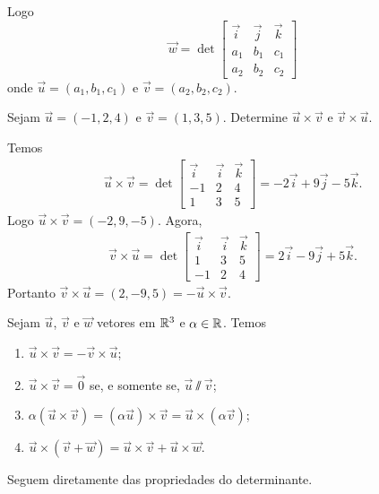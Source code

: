 Logo
\[
    \vec{w} = \det \begin{bmatrix}
        \vec{i} & \vec{j} & \vec{k} \\
        a_1     & b_1     & c_1     \\
        a_2     & b_2     & c_2
    \end{bmatrix}
\]
onde $\vec{u} = (a_1,b_1,c_1)$ e $\vec{v} = (a_2,b_2,c_2)$.

\begin{exemplo}
    Sejam $\vec{u} = (-1,2,4)$ e $\vec{v} = (1,3,5)$. Determine $\vec{u}\times\vec{v}$ e $\vec{v}\times\vec{u}$.
    \begin{solucao}
        Temos
        \begin{align*}
            \vec{u}\times\vec{v} = \det \begin{bmatrix}
                                            \vec{i} & \vec{i} & \vec{k} \\
                                            -1      & 2       & 4       \\
                                            1       & 3       & 5
                                        \end{bmatrix} = -2\vec{i} + 9\vec{j} - 5\vec{k}.
        \end{align*}
        Logo $\vec{u}\times\vec{v} = (-2,9,-5)$.
        Agora,
        \begin{align*}
            \vec{v}\times\vec{u} = \det \begin{bmatrix}
                                            \vec{i} & \vec{i} & \vec{k} \\
                                            1       & 3       & 5       \\
                                            -1      & 2       & 4
                                        \end{bmatrix} = 2\vec{i} - 9\vec{j} + 5\vec{k}.
        \end{align*}
        Portanto $\vec{v}\times\vec{u} = (2,-9,5) = -\vec{u}\times\vec{v}$.
    \end{solucao}
\end{exemplo}

\begin{proposicao}
    Sejam $\vec{u}$, $\vec{v}$ e $\vec{w}$ vetores em $\mathbb{R}^3$ e $\alpha \in \mathbb{R}$. Temos
    \begin{enumerate}[label=({\alph*})]
        \item $\vec{u}\times\vec{v} = -\vec{v}\times\vec{u}$;
        \item $\vec{u}\times\vec{v} = \vec{0}$ se, e somente se, $\vec{u}\varparallel\vec{v}$;
        \item $\alpha(\vec{u}\times\vec{v}) = (\alpha\vec{u})\times\vec{v} = \vec{u}\times(\alpha\vec{v})$;
        \item $\vec{u}\times(\vec{v} + \vec{w}) = \vec{u}\times\vec{v} + \vec{u}\times\vec{w}$.
    \end{enumerate}
\end{proposicao}
\begin{prova}
    Seguem diretamente das propriedades do determinante.
\end{prova}

